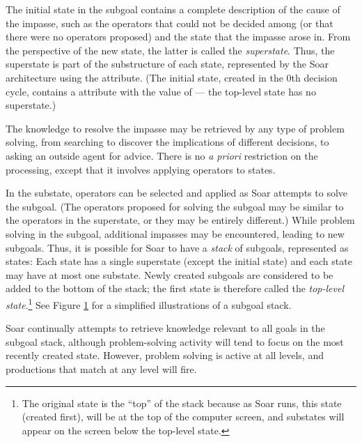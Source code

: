 The initial state in the subgoal contains a complete description of the
cause of the impasse, such as the operators that could not be decided
among (or that there were no operators proposed) and the state that the
impasse arose in. From the perspective of the new state, the latter is
called the \emph{superstate}. Thus, the superstate is part of the
substructure of each state, represented by the Soar architecture using
the  attribute. (The initial state, created in the 0th
decision cycle, contains a  attribute with the value of
 --- the top-level state has no superstate.)

The knowledge to resolve the impasse may be retrieved by any type of
problem solving, from searching to discover the implications of different
decisions, to asking an outside agent for advice. There is no \emph{a priori}
restriction on the processing, except that it involves applying operators to
states.

\begin{figure}
\label{fig:stack1}
\end{figure}

In the substate, operators can be selected and applied as Soar attempts to
solve the subgoal. (The operators proposed for solving the subgoal may be
similar to the operators in the superstate, or they may be entirely
different.) While problem solving in the subgoal, additional impasses may be
encountered, leading to new subgoals.  Thus, it is possible for Soar to have a
\emph{stack} of subgoals, represented as states: Each state has 
a single superstate (except the initial state) and each state may have at most 
one substate. Newly created
subgoals are considered to be added to the bottom of the stack; the first
state is therefore called the \emph{top-level state}.\footnote{The
original state is the ``top'' of the stack because as Soar
runs, this state (created first), will be at the top of the computer screen,
and substates will appear on the screen below the top-level state.}  See
Figure \ref{fig:stack1} for a simplified illustrations of a subgoal stack.

Soar continually attempts to retrieve knowledge relevant to all goals in the
subgoal stack, although problem-solving activity will tend to focus on the
most recently created state. However, problem solving is active at
all levels, and productions that match at any level will fire.


